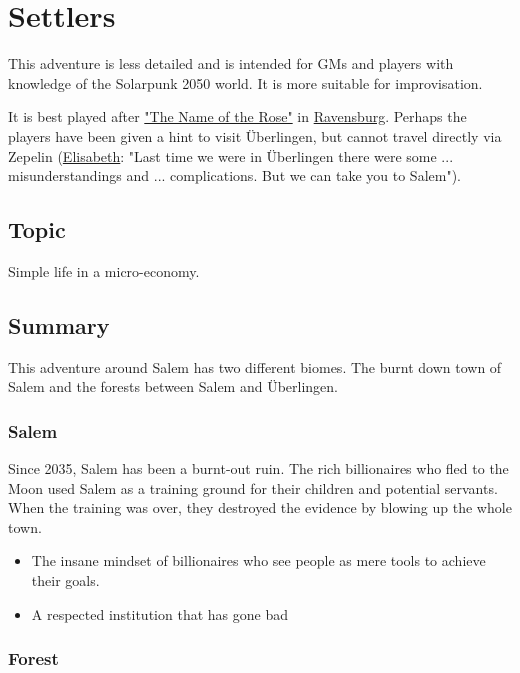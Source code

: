 \chapter{Settlers}
\label{ch:settlers}

This adventure is less detailed and is intended for GMs and players with knowledge of the Solarpunk 2050 world. It is more suitable for improvisation.

It is best played after \hyperref[ch:the name of the rose]{"The Name of the Rose"} in \hyperref[subsec:Ravensburg]{Ravensburg}. Perhaps the players have been given a hint to visit Überlingen, but cannot travel directly via Zepelin (\hyperref[sec:Jaime and Elisabeth]{Elisabeth}: "Last time we were in Überlingen there were some ... misunderstandings and ... complications. But we can take you to Salem").

\section{Topic}

Simple life in a micro-economy.

\section{Summary}

This adventure around Salem has two different biomes. The burnt down town of Salem and the forests between Salem and Überlingen.
\subsection{Salem}

Since 2035, Salem has been a burnt-out ruin.
The rich billionaires who fled to the Moon used Salem as a training ground for their children and potential servants. When the training was over, they destroyed the evidence by blowing up the whole town.

\begin{itemize}
    \item The insane mindset of billionaires who see people as mere tools to achieve their goals.
    \item A respected institution that has gone bad
\end{itemize}

\subsection{Forest}

